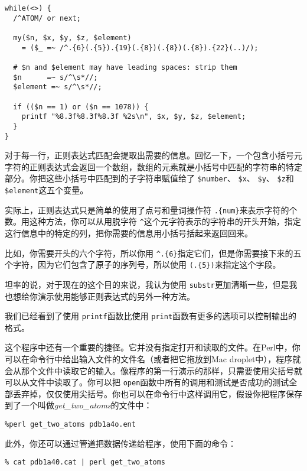 \begin{lstlisting}
while(<>) {
  /^ATOM/ or next;

  my($n, $x, $y, $z, $element)
    = ($_ =~ /^.{6}(.{5}).{19}(.{8})(.{8})(.{8}).{22}(..)/);

  # $n and $element may have leading spaces: strip them
  $n      =~ s/^\s*//;
  $element =~ s/^\s*//;

  if (($n == 1) or ($n == 1078)) {
    printf "%8.3f%8.3f%8.3f %2s\n", $x, $y, $z, $element;
  }
}
\end{lstlisting}

对于每一行，正则表达式匹配会提取出需要的信息。回忆一下，一个包含小括号元字符的正则表达式会返回一个数组，数组的元素就是小括号中匹配的字符串的特定部分。你把这些小括号中匹配到的子字符串赋值给了 \verb|$number|、 \verb|$x|、 \verb|$y|、 \verb|$z|和 \verb|$element|这五个变量。

实际上，正则表达式只是简单的使用了点号和量词操作符 \verb|.{num}|来表示字符的个数。用这种方法，你可以从用脱字符 \verb|^|这个元字符表示的字符串的开头开始，指定这行信息中的特定的列，把你需要的信息用小括号括起来返回回来。

比如，你需要开头的六个字符，所以你用 \verb|^.{6}|指定它们，但是你需要接下来的五个字符，因为它们包含了原子的序列号，所以使用 \verb|(.{5})|来指定这个字段。

坦率的说，对于现在的这个目的来说，我认为使用 \verb|substr|更加清晰一些，但是我也想给你演示使用能够正则表达式的另外一种方法。

我们已经看到了使用 \verb|printf|函数比使用 \verb|print|函数有更多的选项可以控制输出的格式。

这个程序中还有一个重要的捷径。它并没有指定打开和读取的文件。在Perl中，你可以在命令行中给出输入文件的文件名（或者把它拖放到Mac
droplet中），程序就会从那个文件中读取它的输入。像程序的第一行演示的那样，只需要使用尖括号就可以从文件中读取了。你可以把 \verb|open|函数中所有的调用和测试是否成功的测试全部丢弃掉，仅仅使用尖括号。你也可以在命令行中这样调用它，假设你把程序保存到了一个叫做\textit{get\_two\_atoms}的文件中：

\begin{lstlisting}
%perl get_two_atoms pdb1a4o.ent
\end{lstlisting}

此外，你还可以通过管道把数据传递给程序，使用下面的命令：

\begin{lstlisting}
% cat pdb1a40.cat | perl get_two_atoms
\end{lstlisting}

